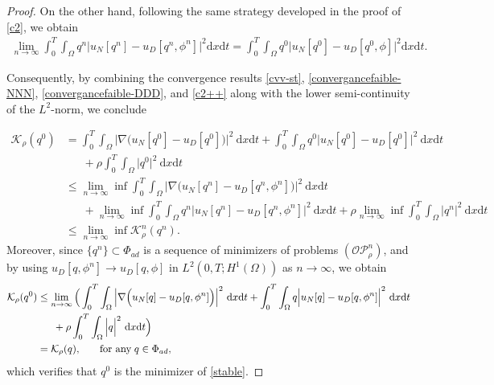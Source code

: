 \documentclass[10pt,a4paper]{amsart}
\newcommand{\dt} {\displaystyle\mathrm{d}t}
\newcommand{\dx} {\displaystyle\mathrm{d}x}
\begin{document}
\begin{proof}
On the other hand, following the same strategy developed in the proof of \eqref{c2}, we obtain
\begin{align} \label{c2++}
    \lim_{n \rightarrow \infty} \int_0^T \int_\Omega q^n \Big| u_N[q^n] - u_D[q^n, \phi^n] \Big|^2 \dx \dt = \int_0^T \int_\Omega q^0 \Big| u_N[q^0] - u_D[q^0, \phi] \Big|^2 \dx \dt.
\end{align}

Consequently, by combining the convergence results \eqref{cvv-st}, \eqref{convergancefaible-NNN}, \eqref{convergancefaible-DDD}, and \eqref{c2++} along with the lower semi-continuity of the $L^2$-norm, we conclude

\begin{align*}
\mathcal{K}_\rho(q^0) &=\int_0^T \int_{\Omega}\Big|\nabla\Big(
 u_N[q^0]- u_D[q^0]\Big)\Big|^2\ \dx \dt + \int_0^T \int_{\Omega}q^0\Big|
 u_N[q^0]- u_D[q^0]\Big|^2\ \dx\dt\\
&\;\;\quad +\rho\int_0^T \int_{\Omega}\Big|q^0\Big|^2\ \dx\dt\\
&\leq\lim_{n\rightarrow\infty}\inf\int_0^T \int_{\Omega}\Big|\nabla\Big(
 u_N[q^n]- u_D[q^n,\phi^n]\Big)\Big|^2\ \dx \dt \\
&\;\;\quad + \lim_{n\rightarrow\infty}\inf\int_0^T \int_{\Omega}q^n\Big|
 u_N[q^n]- u_D[q^n,\phi^n]\Big|^2\ \dx\dt+ \rho\lim_{n\rightarrow\infty}\inf\int_0^T \int_{\Omega}\Big|q^n\Big|^2\ \dx\dt\\
&\leq \lim_{n\rightarrow\infty}\inf \mathcal{K}^n_\rho(q^n).
\end{align*}
Moreover, since \(\{ q^n \} \subset \Phi_{ad}\) is a sequence of minimizers of problems \((\mathcal{O}\mathcal{P}_{\rho}^n)\), and by using \(u_D[q,\phi^n] \longrightarrow u_D[q,\phi]\) in \(L^2(0, T; H^1(\Omega))\) as \(n \longrightarrow \infty\), we obtain
\begin{align*} 
\mathcal{K}_\rho(q^0)&\leq\lim_{n\rightarrow\infty}\Big(\int_0^T \int_{\Omega}\Big|\nabla\Big(
 u_N[q]- u_D[q,\phi^n]\Big)\Big|^2\ \dx \dt + \int_0^T \int_{\Omega}q\Big|
 u_N[q]- u_D[q,\phi^n]\Big|^2\ \dx\dt \\
 &\;\; \quad + \rho\int_0^T \int_{\Omega}\Big|q\Big|^2\ \dx\dt \Big)\\
&=\mathcal{K}_\rho(q), \quad \;\;\; \hbox{for any} \; q \in \Phi_{ad},
\end{align*}
which verifies that $q^0$ is the minimizer of \eqref{stable}.
\end{proof}
\end{document}
